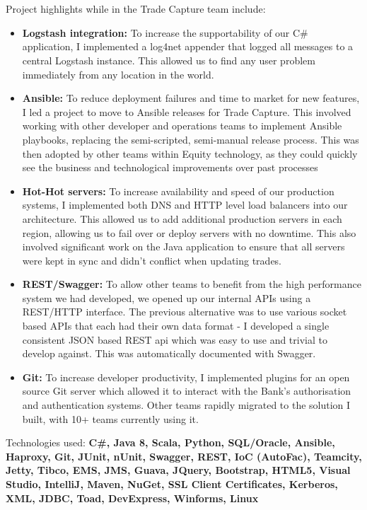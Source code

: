 \documentclass[11pt,a4paper, roman]{moderncv} %
\begin{document}
{\\\\Project highlights while in the Trade Capture team include:
\begin{itemize}
\item \textbf{Logstash integration:} To increase the supportability of our C\# application, I implemented a log4net appender that logged all messages to a central Logstash instance. This allowed us to find any user problem immediately from any location in the world.
\item \textbf{Ansible:} To reduce deployment failures and time to market for new features, I led a project to move to Ansible releases for Trade Capture. This involved working with other developer and operations teams to implement Ansible playbooks, replacing the semi-scripted, semi-manual release process. This was then adopted by other teams within Equity technology, as they could quickly see the business and technological improvements over past processes
\item \textbf{Hot-Hot servers:} To increase availability and speed of our production systems, I implemented both DNS and HTTP level load balancers into our architecture. This allowed us to add additional production servers in each region, allowing us to fail over or deploy servers with no downtime. This also involved significant work on the Java application to ensure that all servers were kept in sync and didn't conflict when updating trades.
\item \textbf{REST/Swagger:} To allow other teams to benefit from the high performance system we had developed, we opened up our internal APIs using a REST/HTTP interface. The previous alternative was to use various socket based APIs that each had their own data format - I developed a single consistent JSON based REST api which was easy to use and trivial to develop against. This was automatically documented with Swagger.
\newpage
\item \textbf{Git:} To increase developer productivity, I implemented plugins for an open source Git server which allowed it to interact with the Bank's authorisation and authentication systems. Other teams rapidly migrated to the solution I built, with 10+ teams currently using it.
\end{itemize}
Technologies used: \textbf{C\#, Java 8, Scala, Python, SQL/Oracle, Ansible, Haproxy, Git, JUnit, nUnit, Swagger, REST, IoC (AutoFac), Teamcity, Jetty, Tibco, EMS, JMS, Guava, JQuery, Bootstrap, HTML5, Visual Studio, IntelliJ, Maven, NuGet, SSL Client Certificates, Kerberos, XML, JDBC, Toad, DevExpress, Winforms, Linux}
}
\end{document}
